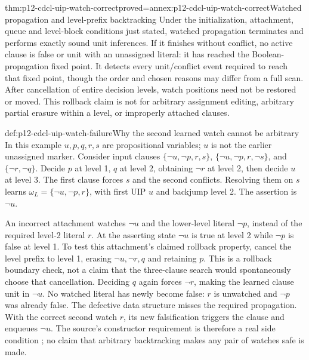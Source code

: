 \begin{hbtheorem}{thm:p12-cdcl-uip-watch-correct}{proved=annex:p12-cdcl-uip-watch-correct}{Watched propagation and level-prefix backtracking}
Under the initialization, attachment, queue and level-block conditions just
stated, watched propagation terminates and performs exactly sound unit
inferences.  If it finishes without conflict, no active clause is false or
unit with an unassigned literal: it has reached the Boolean-propagation fixed
point.  It detects every unit/conflict event required to reach that fixed
point, though the order and chosen reasons may differ from a full scan.
After cancellation of entire decision levels, watch positions need not be
restored or moved.  This rollback claim is not for arbitrary assignment
editing, arbitrary partial erasure within a level, or improperly attached
clauses.
\end{hbtheorem}

\begin{hbexample}{def:p12-cdcl-uip-watch-failure}{Why the second learned watch cannot be arbitrary}
In this example \(u,p,q,r,s\) are propositional variables; \(u\) is not
the earlier unassigned marker.  Consider input clauses
\(\{\neg u,\neg p,r,s\}\),
\(\{\neg u,\neg p,r,\neg s\}\), and \(\{\neg r,\neg q\}\).
Decide \(p\) at level 1, \(q\) at level 2, obtaining \(\neg r\) at
level 2, then decide \(u\) at level 3.  The first clause forces \(s\)
and the second conflicts.  Resolving them on \(s\) learns
\(\omega_L=\{\neg u,\neg p,r\}\), with first UIP \(u\) and
backjump level 2.  The assertion is \(\neg u\).

An incorrect attachment watches \(\neg u\) and the lower-level literal
\(\neg p\), instead of the required level-2 literal \(r\).
At the asserting state \(\neg u\) is true at level 2 while \(\neg p\)
is false at level 1.  To test this attachment's claimed rollback property,
cancel the level prefix to level 1, erasing \(\neg u,\neg r,q\) and
retaining \(p\).  This is a rollback boundary check, not a claim that the
three-clause search would spontaneously choose that cancellation.
Deciding \(q\) again
forces \(\neg r\), making the learned clause unit in \(\neg u\).
No watched literal has newly become false: \(r\) is unwatched and
\(\neg p\) was already false.  The defective data structure misses the
required propagation.  With the correct second watch \(r\), its new
falsification triggers the clause and enqueues \(\neg u\).  The source's
constructor requirement is therefore a real side condition
\cite[Fig.~8]{EenSorenssonMiniSatExtended12}; no claim that arbitrary
backtracking makes any pair of watches safe is made.
\end{hbexample}

